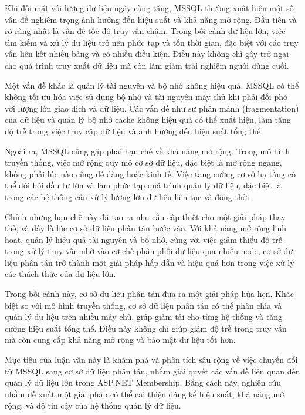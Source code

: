 \documentclass{extreport}[13.5pt, oneside,a4paper]
\begin{document}
Khi đối mặt với lượng dữ liệu ngày càng tăng, MSSQL thường xuất hiện một số vấn đề nghiêm trọng ảnh hưởng đến hiệu suất và khả năng mở rộng. Đầu tiên và rõ ràng nhất là vấn đề tốc độ truy vấn chậm. Trong bối cảnh dữ liệu lớn, việc tìm kiếm và xử lý dữ liệu trở nên phức tạp và tốn thời gian, đặc biệt với các truy vấn liên kết nhiều bảng và có nhiều điều kiện. Điều này không chỉ gây trở ngại cho quá trình truy xuất dữ liệu mà còn làm giảm trải nghiệm người dùng cuối.

Một vấn đề khác là quản lý tài nguyên và bộ nhớ không hiệu quả. MSSQL có thể không tối ưu hóa việc sử dụng bộ nhớ và tài nguyên máy chủ khi phải đối phó với lượng lớn giao dịch và dữ liệu. Các vấn đề như sự phân mảnh (fragmentation) của dữ liệu và quản lý bộ nhớ cache không hiệu quả có thể xuất hiện, làm tăng độ trễ trong việc truy cập dữ liệu và ảnh hưởng đến hiệu suất tổng thể.

Ngoài ra, MSSQL cũng gặp phải hạn chế về khả năng mở rộng. Trong mô hình truyền thống, việc mở rộng quy mô cơ sở dữ liệu, đặc biệt là mở rộng ngang, không phải lúc nào cũng dễ dàng hoặc kinh tế. Việc tăng cường cơ sở hạ tầng có thể đòi hỏi đầu tư lớn và làm phức tạp quá trình quản lý dữ liệu, đặc biệt là trong các hệ thống cần xử lý lượng lớn dữ liệu liên tục và đồng thời.

Chính những hạn chế này đã tạo ra nhu cầu cấp thiết cho một giải pháp thay thế, và đây là lúc cơ sở dữ liệu phân tán bước vào. Với khả năng mở rộng linh hoạt, quản lý hiệu quả tài nguyên và bộ nhớ, cùng với việc giảm thiểu độ trễ trong xử lý truy vấn nhờ vào cơ chế phân phối dữ liệu qua nhiều node, cơ sở dữ liệu phân tán trở thành một giải pháp hấp dẫn và hiệu quả hơn trong việc xử lý các thách thức của dữ liệu lớn.

Trong bối cảnh này, cơ sở dữ liệu phân tán đưa ra một giải pháp hứa hẹn. Khác biệt so với mô hình truyền thống, cơ sở dữ liệu phân tán có thể phân chia và quản lý dữ liệu trên nhiều máy chủ, giúp giảm tải cho từng hệ thống và tăng cường hiệu suất tổng thể. Điều này không chỉ giúp giảm độ trễ trong truy vấn mà còn cung cấp khả năng mở rộng và bảo mật dữ liệu tốt hơn.

Mục tiêu của luận văn này là khám phá và phân tích sâu rộng về việc chuyển đổi từ MSSQL sang cơ sở dữ liệu phân tán, nhằm giải quyết các vấn đề liên quan đến quản lý dữ liệu lớn trong ASP.NET Membership. Bằng cách này, nghiên cứu nhằm đề xuất một giải pháp có thể cải thiện đáng kể hiệu suất, khả năng mở rộng, và độ tin cậy của hệ thống quản lý dữ liệu.
\end{document}

